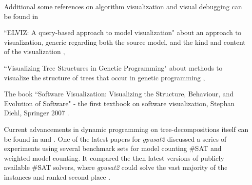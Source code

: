 \documentclass[a4paper, 12pt, bibliography=totoc]{scrartcl}
\begin{document}
%


Additional some references on algorithm visualization and visual debugging can be found in

	 ``ELVIZ: A query-based approach to model visualization" about an approach to visualization, generic regarding both the source model, and the kind and content of the visualization \cite{ELVIZ},
	
	 ``Visualizing Tree Structures in Genetic Programming" about methods to visualize the structure of trees that occur in genetic programming \cite{VisuTDinGP},
	
	 The book ``Software Visualization: Visualizing the Structure, Behaviour, and Evolution of Software" - the first textbook on software visualization, Stephan Diehl, Springer 2007 \cite{SoftwareVisualization}.



Current advancements in dynamic programming on tree-decompositions itself can be found in \cite{dpdbpadl2020} and \cite{taminghightw}. One of the latest papers for \textit{gpusat2} discussed a series of experiments using several benchmark sets for model counting \#SAT and weighted model counting. It compared the then latest versions of publicly available \#SAT solvers, where \textit{gpusat2} could solve the vast majority of the instances and ranked second place \cite[Ch. 5]{fichtegpusat2}. 
\end{document}
